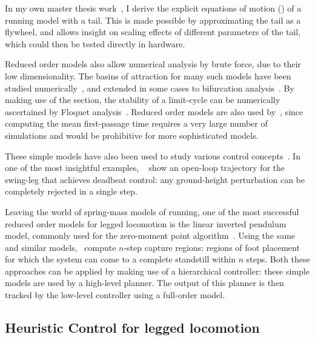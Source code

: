 In my own master thesis work~\cite{heim2016designing}, I derive the explicit equations of motion (\eom) of a running model with a tail. This is made possible by approximating the tail as a flywheel, and allows insight on scaling effects of different parameters of the tail, which could then be tested directly in hardware. \par
Reduced order models also allow numerical analysis by brute force, due to their low dimensionality. The basins of attraction for many such models have been studied numerically~\cite{schwab2001basin,obayashi2016formation,cnops2015basin,rummel2008stable}, and extended in some cases to bifurcation analysis~\cite{aoi2006bifurcation,merker2015stable,gan2018all}. By making use of the \poincare section, the stability of a limit-cycle can be numerically ascertained by Floquet analysis~\cite{remy2011matlab}.
Reduced order models are also used by~\textcite{byl2009metastable}, since computing the mean first-passage time requires a very large number of simulations and would be prohibitive for more sophisticated models. \par
These simple models have also been used to study various control concepts~\cite{piovan2013two,cnops2015basin,piovan2015reachability}. In one of the most insightful examples, ~\textcite{wu20133} show an open-loop trajectory for the swing-leg that achieves deadbeat control: any ground-height perturbation can be completely rejected in a single step. \par 
Leaving the world of spring-mass models of running, one of the most successful reduced order models for legged locomotion is the linear inverted pendulum model, commonly used for the zero-moment point algorithm~\cite{kajita2001LIP,kajita2003ZMP}. Using the same and similar models,~\textcite{koolen2012capturability} compute $n$-step capture regions: regions of foot placement for which the system can come to a complete standstill within $n$ steps. Both these approaches can be applied by making use of a hierarchical controller: these simple models are used by a high-level planner. The output of this planner is then tracked by the low-level controller using a full-order model.

\subsection{Heuristic Control for legged locomotion}


